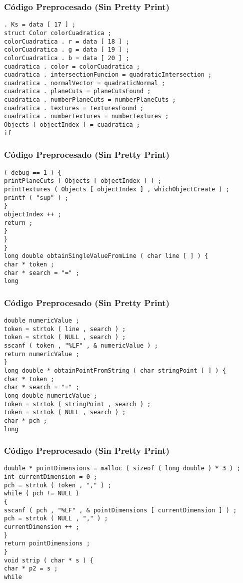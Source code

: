 \documentclass{beamer}
\begin{document}
\begin{frame}[fragile]
\frametitle{C\'odigo Preprocesado (Sin Pretty Print)}
\begin{lstlisting}[style=CStyle]
. Ks = data [ 17 ] ; 
struct Color colorCuadratica ; 
colorCuadratica . r = data [ 18 ] ; 
colorCuadratica . g = data [ 19 ] ; 
colorCuadratica . b = data [ 20 ] ; 
cuadratica . color = colorCuadratica ; 
cuadratica . intersectionFuncion = quadraticIntersection ; 
cuadratica . normalVector = quadraticNormal ; 
cuadratica . planeCuts = planeCutsFound ; 
cuadratica . numberPlaneCuts = numberPlaneCuts ; 
cuadratica . textures = texturesFound ; 
cuadratica . numberTextures = numberTextures ; 
Objects [ objectIndex ] = cuadratica ; 
if \end{lstlisting}
\end{frame}
\begin{frame}[fragile]
\frametitle{C\'odigo Preprocesado (Sin Pretty Print)}
\begin{lstlisting}[style=CStyle]
( debug == 1 ) { 
printPlaneCuts ( Objects [ objectIndex ] ) ; 
printTextures ( Objects [ objectIndex ] , whichObjectCreate ) ; 
printf ( "sup" ) ; 
} 
objectIndex ++ ; 
return ; 
} 
} 
} 
long double obtainSingleValueFromLine ( char line [ ] ) { 
char * token ; 
char * search = "=" ; 
long \end{lstlisting}
\end{frame}
\begin{frame}[fragile]
\frametitle{C\'odigo Preprocesado (Sin Pretty Print)}
\begin{lstlisting}[style=CStyle]
double numericValue ; 
token = strtok ( line , search ) ; 
token = strtok ( NULL , search ) ; 
sscanf ( token , "%LF" , & numericValue ) ; 
return numericValue ; 
} 
long double * obtainPointFromString ( char stringPoint [ ] ) { 
char * token ; 
char * search = "=" ; 
long double numericValue ; 
token = strtok ( stringPoint , search ) ; 
token = strtok ( NULL , search ) ; 
char * pch ; 
long \end{lstlisting}
\end{frame}
\begin{frame}[fragile]
\frametitle{C\'odigo Preprocesado (Sin Pretty Print)}
\begin{lstlisting}[style=CStyle]
double * pointDimensions = malloc ( sizeof ( long double ) * 3 ) ; 
int currentDimension = 0 ; 
pch = strtok ( token , "," ) ; 
while ( pch != NULL ) 
{ 
sscanf ( pch , "%LF" , & pointDimensions [ currentDimension ] ) ; 
pch = strtok ( NULL , "," ) ; 
currentDimension ++ ; 
} 
return pointDimensions ; 
} 
void strip ( char * s ) { 
char * p2 = s ; 
while \end{lstlisting}
\end{frame}
\end{document}
